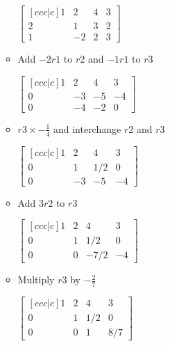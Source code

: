\begin{itemize}
\begin{itemize}
        \begin{center}
            $\begin{bmatrix}[ccc|c]
                1 & 2 & 4 & 3 \\
                2 & 1 & 3 & 2 \\
                1 & -2 & 2 & 3
            \end{bmatrix}$    
        \end{center}

        \item Add $-2r1$ to $r2$ and $-1r1$ to $r3$

        \begin{center}
            $\begin{bmatrix}[ccc|c]
                1 & 2 & 4 & 3 \\
                0 & -3 & -5 & -4 \\
                0 & -4 & -2 & 0
            \end{bmatrix}$    
        \end{center}

        \item $r3 \times -\frac{1}{4}$ and interchange $r2$ and $r3$
        
        \begin{center}
            $\begin{bmatrix}[ccc|c]
                1 & 2 & 4 & 3 \\
                0 & 1 & 1/2 & 0 \\
                0 & -3 & -5 & -4
            \end{bmatrix}$
        \end{center}

        \item Add $3r2$ to $r3$ 

        \begin{center}
            $\begin{bmatrix}[ccc|c]
                1 & 2 & 4 & 3 \\
                0 & 1 & 1/2 & 0 \\
                0 & 0 & -7/2 & -4
            \end{bmatrix}$
        \end{center}

        \item Multiply $r3$ by $-\frac{2}{7}$

        \begin{center}
            $\begin{bmatrix}[ccc|c]
                1 & 2 & 4 & 3 \\
                0 & 1 & 1/2 & 0 \\
                0 & 0 & 1 & 8/7
            \end{bmatrix}$
        \end{center}


\end{itemize}
\end{itemize}
